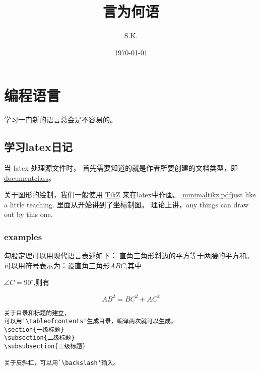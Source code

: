 \documentclass[cn,11pt]{elegantbook}
\title{言为何语}
\author{S.K.}
\date{\today}
\institute{蹈微}
\newcommand\degree{^\circ} %
\begin{document}
\maketitle%
\frontmatter
\tableofcontents%
\mainmatter


\chapter{编程语言}

学习一门新的语言总会是不容易的。

\section{学习latex日记}
  
当 latex 处理源文件时， 首先需要知道的就是作者所要创建的文档类型，即
\href{https://zhuanlan.zhihu.com/p/247888156}{\underline{documentclass}}。


关于图形的绘制，我们一般使用
\href{https://zhuanlan.zhihu.com/p/48300815}{\underline{TikZ}}
来在latex中作画。
\href{http://cremeronline.com/LaTeX/minimaltikz.pdf}{\underline{minimaltikz.pdf}}just like a little teaching.
里面从开始讲到了坐标制图。
 理论上讲，any things can draw out by this one.


\subsection{examples}

勾股定理可以用现代语言表述如下：
直角三角形斜边的平方等于两腰的平方和。
可以用符号表示为：设直角三角形$ABC$,其中

$\angle C=90\degree$,则有 %

\begin{equation} %
AB^2=BC^2+AC^2
\end{equation}



      
\begin{lstlisting}
关于目录和标题的建立， 
可以用'\tableofcontents'生成目录，编译两次就可以生成。
\section{一级标题}
\subsection{二级标题} 
\subsubsection{三级标题}

关于反斜杠，可以用`\backslash'输入。
\end{lstlisting}
\end{document}
